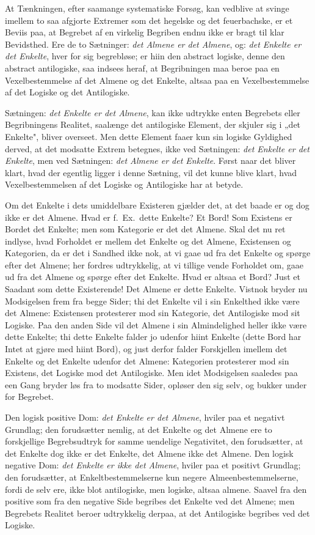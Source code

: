 \documentclass[12pt]{book}
\newcommand{\opage}[1]{\marginnote{\footnotesize\textit{[#1]}}}
\begin{document}
At Tænkningen, efter saamange systematiske Forsøg, kan vedblive at svinge imellem to saa
afgjorte Extremer som det hegelske og det feuerbachske, er et Beviis paa, at Begrebet af en
virkelig Begriben endnu ikke er bragt til klar Bevidsthed. Ere de to Sætninger: \emph{det Almene
er det Almene}, og: \emph{det Enkelte er det Enkelte}, hver for sig begrebløse; er hiin den
abstract logiske, denne den abstract antilogiske, saa indsees heraf, at Begribningen maa beroe
paa en Vexelbestemmelse af det Almene og det Enkelte, altsaa paa en Vexelbestemmelse af det
Logiske og det Antilogiske.

Sætningen: \emph{det Enkelte er det Almene}, kan ikke udtrykke enten Begrebets eller
Begribningens Realitet, saalænge det antilogiske Element, der skjuler sig i „det Enkelte",
bliver overseet. Men dette Element faaer kun sin logiske Gyldighed derved, at det modsatte
Extrem betegnes, ikke ved Sætningen: \emph{det Enkelte er det Enkelte}, men ved Sætningen:
\emph{det Almene er det Enkelte}. Først naar det bliver klart, hvad der egentlig ligger i denne
Sætning, vil det kunne blive klart, hvad Vexelbestemmelsen af det Logiske og Antilogiske har at
betyde.

Om det Enkelte i dets umiddelbare Existeren gjælder det, at det baade er og dog ikke er det
Almene. Hvad er f.\ Ex.\ dette Enkelte? Et Bord! Som Existens er Bordet det Enkelte; men som
Kategorie er det det Almene. Skal det nu ret indlyse, hvad Forholdet er mellem det Enkelte og
det Almene, Existensen og Kategorien, da er det i Sandhed ikke nok, at vi gaae ud fra det
Enkelte og spørge efter det Almene; her fordres udtrykkelig, at vi tillige vende Forholdet om,
gaae ud fra det Almene og spørge efter det Enkelte. Hvad er altsaa et Bord? Just et Saadant som
dette Existerende! Det Almene er dette Enkelte. Vistnok bryder nu
\opage{161} Modsigelsen frem fra begge Sider; thi det Enkelte vil i sin Enkelthed ikke være det Almene:
Existensen protesterer mod sin Kategorie, det Antilogiske mod sit Logiske. Paa den anden Side
vil det Almene i sin Almindelighed heller ikke være dette Enkelte; thi dette Enkelte falder jo
udenfor hiint Enkelte (dette Bord har Intet at gjøre med hiint Bord), og just derfor falder
Forskjellen imellem det Enkelte og det Enkelte udenfor det Almene: Kategorien protesterer mod
sin Existens, det Logiske mod det Antilogiske. Men idet Modsigelsen saaledes paa een Gang bryder
løs fra to modsatte Sider, opløser den sig selv, og bukker under for Begrebet.

Den logisk positive Dom: \emph{det Enkelte er det Almene}, hviler paa et negativt Grundlag; den
forudsætter nemlig, at det Enkelte og det Almene ere to forskjellige Begrebsudtryk for samme
uendelige Negativitet, den forudsætter, at det Enkelte dog ikke er det Enkelte, det Almene ikke
det Almene. Den logisk negative Dom: \emph{det Enkelte er ikke det Almene}, hviler paa et
positivt Grundlag; den forudsætter, at Enkeltbestemmelserne kun negere Almeenbestemmelserne,
fordi de selv ere, ikke blot antilogiske, men logiske, altsaa almene. Saavel fra den positive
som fra den negative Side begribes det Enkelte ved det Almene; men Begrebets Realitet beroer
udtrykkelig derpaa, at det Antilogiske begribes ved det Logiske.
\end{document}
